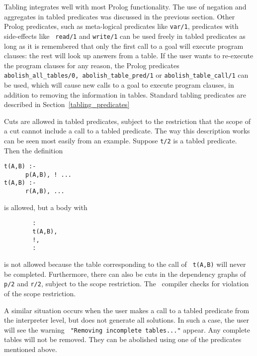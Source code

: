 Tabling integrates well with most Prolog functionality.  The use of
negation and aggregates in tabled predicates was discussed in the
previous section.  Other Prolog predicates, such as meta-logical
predicates like {\tt var/1}, predicates with side-effects like {\tt
read/1} and {\tt write/1} can be used freely in tabled predicates as
long as it is remembered that only the first call to a goal will
execute program clauses: the rest will look up answers from a table.
If the user wants to re-execute the program clauses for any reason, the
Prolog predicates {\tt abolish\_all\_tables/0, abolish\_table\_pred/1}
or {\tt abolish\_table\_call/1} can be used, which will cause new
calls to a goal to execute program clauses, in addition to removing
the information in tables.  Standard tabling predicates are described
in Section~\ref{tabling_predicates}

Cuts are allowed in tabled predicates, subject to the restriction that
the scope of a cut cannot include a call to a tabled predicate.  The
way this description works can be seen most easily from an example.
Suppose {\tt t/2} is a tabled predicate.  Then the definition
\begin{center}
\begin{minipage}{1.7in}
\begin{verbatim}
t(A,B) :-
      p(A,B), ! ...
t(A,B) :- 
      r(A,B), ...
\end{verbatim}						       
\end{minipage}
\end{center}
is allowed, but a body with
\begin{center}
\begin{minipage}{1.5in}
\begin{verbatim}
        :
        t(A,B),
        !,
        :
\end{verbatim}						       
\end{minipage}
\end{center}
is not allowed because the table corresponding to the call of {\tt
t(A,B)} will never be completed.  Furthermore, there can also be cuts
in the dependency graphs of {\tt p/2} and {\tt r/2}, subject to the
scope restriction.  The \ourprolog\ compiler checks for violation of
the scope restriction.

A similar situation occurs when the user makes a call to a tabled
predicate from the interpreter level, but does not generate all
solutions.  In such a case, the user will see the warning {\tt
"Removing incomplete tables..."} appear.  Any complete tables will
not be removed.  They can be abolished using one of the predicates
mentioned above.

